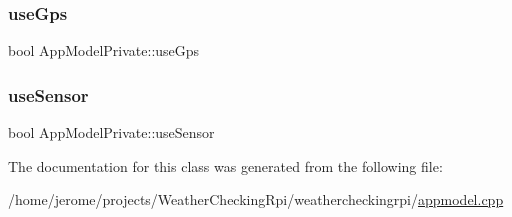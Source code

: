 \subsubsection{\texorpdfstring{use\+Gps}{useGps}}
{\footnotesize\ttfamily bool App\+Model\+Private\+::use\+Gps}

\mbox{\label{class_app_model_private_a374b10db8a3d40b56cf11bca2a2e3406}} 
\subsubsection{\texorpdfstring{use\+Sensor}{useSensor}}
{\footnotesize\ttfamily bool App\+Model\+Private\+::use\+Sensor}



The documentation for this class was generated from the following file\+:\begin{DoxyCompactItemize}
\item 
/home/jerome/projects/\+Weather\+Checking\+Rpi/weathercheckingrpi/\hyperlink{appmodel_8cpp}{appmodel.\+cpp}\end{DoxyCompactItemize}
